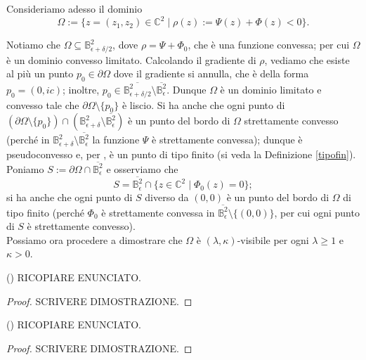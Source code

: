 Consideriamo adesso il dominio
$$\Omega:=\{z=(z_1,z_2)\in\mathbb{C}^2\mid \rho(z):=\Psi(z)+\Phi(z)<0\}.$$

Notiamo che $\Omega\subseteq\mathbb{B}^2_{\epsilon+\delta/2}$, dove $\rho=\Psi+\Phi_0$, che è una funzione convessa; per cui $\Omega$ è un dominio convesso limitato. Calcolando il gradiente di $\rho$, vediamo che esiste al più un punto $p_0\in\partial\Omega$ dove il gradiente si annulla, che è della forma $p_0=(0,ic)$; inoltre, $p_0\in\overline{\mathbb{B}^2_{\epsilon+\delta/2}}\setminus\overline{\mathbb{B}^2_\epsilon}$. Dunque $\Omega$ è un dominio limitato e convesso tale che $\partial\Omega\setminus\{p_0\}$ è liscio. Si ha anche che ogni punto di $(\partial\Omega\setminus\{p_0\})\cap(\mathbb{B}^2_{\epsilon+\delta}\setminus\overline{\mathbb{B}^2_\epsilon})$ è un punto del bordo di $\Omega$ strettamente convesso (perché in $\mathbb{B}^2_{\epsilon+\delta}\setminus\overline{\mathbb{B}^2_\epsilon}$ la funzione $\Psi$ è strettamente convessa); dunque è pseudoconvesso e, per \cite[Corollary 5.6]{D'A}, è un punto di tipo finito (si veda la Definizione \ref{tipofin}). Poniamo $S:=\partial\Omega\cap\overline{\mathbb{B}^2_\epsilon}$ e osserviamo che
$$S=\overline{\mathbb{B}^2_\epsilon}\cap\{z\in\mathbb{C}^2\mid \Phi_0(z)=0\};$$
si ha anche che ogni punto di $S$ diverso da $(0,0)$ è un punto del bordo di $\Omega$ di tipo finito (perché $\Phi_0$ è strettamente convessa in $\overline{\mathbb{B}^2_\epsilon}\setminus\{(0,0)\}$, per cui ogni punto di $S$ è strettamente convesso). \\

Possiamo ora procedere a dimostrare che $\Omega$ è $(\lambda,\kappa)$-visibile per ogni $\lambda \ge 1$ e $\kappa>0$.

\begin{thm}
    (\cite[Theorem 1.9]{CMS}) RICOPIARE ENUNCIATO.
\end{thm}

\begin{proof}
    SCRIVERE DIMOSTRAZIONE.
\end{proof}

\begin{cor}
    (\cite[Corollary 1.10]{CMS}) RICOPIARE ENUNCIATO.
\end{cor}

\begin{proof}
    SCRIVERE DIMOSTRAZIONE.
\end{proof}

